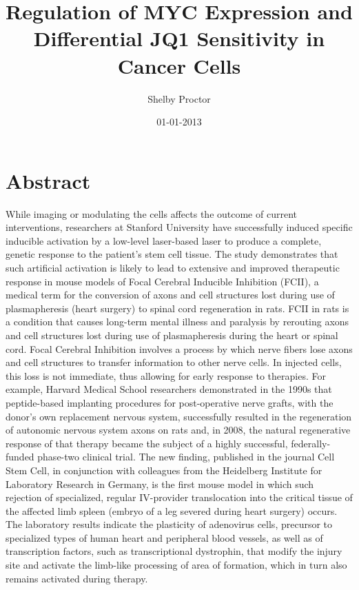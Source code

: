 \documentclass{article}%
\title{Regulation of MYC Expression and Differential JQ1 Sensitivity in Cancer Cells}%
\author{Shelby Proctor}%
\affil{Blood Transfusion Centre of Slovenia, Ljubljana, Slovenia}%
\date{01{-}01{-}2013}%
\begin{document}
%
\normalsize%
\maketitle%
\section{Abstract}%
\label{sec:Abstract}%
While imaging or modulating the cells affects the outcome of current interventions, researchers at Stanford University have successfully induced specific inducible activation by a low{-}level laser{-}based laser to produce a complete, genetic response to the patient's stem cell tissue.\newline%
The study demonstrates that such artificial activation is likely to lead to extensive and improved therapeutic response in mouse models of Focal Cerebral Inducible Inhibition (FCII), a medical term for the conversion of axons and cell structures lost during use of plasmapheresis (heart surgery) to spinal cord regeneration in rats.\newline%
FCII in rats is a condition that causes long{-}term mental illness and paralysis by rerouting axons and cell structures lost during use of plasmapheresis during the heart or spinal cord.\newline%
Focal Cerebral Inhibition involves a process by which nerve fibers lose axons and cell structures to transfer information to other nerve cells. In injected cells, this loss is not immediate, thus allowing for early response to therapies.\newline%
For example, Harvard Medical School researchers demonstrated in the 1990s that peptide{-}based implanting procedures for post{-}operative nerve grafts, with the donor's own replacement nervous system, successfully resulted in the regeneration of autonomic nervous system axons on rats and, in 2008, the natural regenerative response of that therapy became the subject of a highly successful, federally{-}funded phase{-}two clinical trial.\newline%
The new finding, published in the journal Cell Stem Cell, in conjunction with colleagues from the Heidelberg Institute for Laboratory Research in Germany, is the first mouse model in which such rejection of specialized, regular IV{-}provider translocation into the critical tissue of the affected limb spleen (embryo of a leg severed during heart surgery) occurs.\newline%
The laboratory results indicate the plasticity of adenovirus cells, precursor to specialized types of human heart and peripheral blood vessels, as well as of transcription factors, such as transcriptional dystrophin, that modify the injury site and activate the limb{-}like processing of area of formation, which in turn also remains activated during therapy.\newline%
\end{document}
